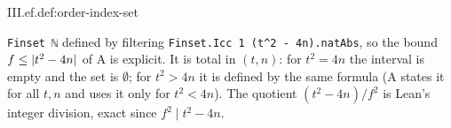 \begin{definition}
\end{definition}
\begin{tfformal}{III.ef.def:order-index-set}
\begin{tffidelity}
\texttt{Finset ℕ} defined by filtering \texttt{Finset.Icc 1 (t\^{}2 - 4n).natAbs}, so the bound $f\le\lvert t^2-4n\rvert$ of A is explicit. It is total in $(t,n)$: for $t^2=4n$ the interval is empty and the set is $\emptyset$; for $t^2>4n$ it is defined by the same formula (A states it for all $t,n$ and uses it only for $t^2<4n$). The quotient $(t^2-4n)/f^2$ is Lean's integer division, exact since $f^2\mid t^2-4n$.
\end{tffidelity}
\end{tfformal}

